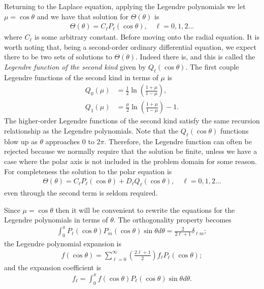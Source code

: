 Returning to the Laplace equation, applying the Legendre polynomials we let $\mu = \cos \theta$ and we have that solution for $\Theta(\theta)$ is
\begin{align}
  \Theta(\theta) = C_\ell P_\ell(\cos \theta), \quad \ell = 0, 1, 2 \ldots
\end{align}
where $C_\ell$ is some arbitrary constant. Before moving onto the radial equation. It is worth noting that, being a second-order ordinary differential equation, we expect there to be two sets of solutions to $\Theta(\theta)$. Indeed there is, and this is called the \emph{Legendre function of the second kind} given by $Q_\ell(\cos \theta)$. The first couple Legendre functions of the second kind in terms of $\mu$ is
\begin{subequations}
\begin{align}
  Q_0(\mu) &=   \frac{1}{2} \ln \left( \frac{ 1 + \mu }{ 1 - \mu } \right) , \\
  Q_1(\mu) &= \frac{\mu}{2} \ln \left( \frac{ 1 + \mu }{ 1 - \mu } \right) - 1 .
\end{align}
\end{subequations}
The higher-order Legendre functions of the second kind satisfy the same recursion relationship as the Legendre polynomials. Note that the $Q_\ell(\cos \theta)$ functions blow up as $\theta$ approaches $0$ to $2\pi$. Therefore, the Legendre function can often be rejected because we normally require that the solution be finite, unless we have a case where the polar axis is not included in the problem domain for some reason. For completeness the solution to the polar equation is
\begin{align}
  \Theta(\theta) = C_\ell P_\ell(\cos \theta) + D_\ell Q_\ell(\cos \theta), \quad \ell = 0, 1, 2 \ldots
\end{align}
even through the second term is seldom required.

Since $\mu = \cos \theta$ then it will be convenient to rewrite the equations for the Legendre polynomials in terms of $\theta$. The orthogonality property becomes
\begin{align}
  \int_0^\pi P_\ell ( \cos \theta ) P_m ( \cos \theta ) \sin \theta d\theta = \frac{2}{2\ell + 1} \delta_{\ell m} ;
\end{align}
the Legendre polynomial expansion is
\begin{align}
  f(\cos \theta) = \sum_{\ell = 0}^\infty \left( \frac{ 2 \ell + 1 }{2 } \right) f_\ell P_\ell(\cos \theta) ;
\end{align}
and the expansion coefficient is
\begin{align}
  f_\ell = \int_0^\pi f(\cos \theta) P_\ell(\cos \theta) \sin \theta d\theta .
\end{align}


